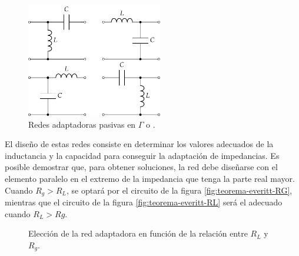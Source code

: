\begin{figure}[H]
  \centering \includegraphics[height=5cm]{../figs/Everitt_LC.pdf}
  \caption{Redes adaptadoras pasivas en $\Gamma$ o
    .}
  \label{fig:teorema-everitt-redes}
\end{figure}

El diseño de estas redes consiste en determinar los valores adecuados
de la inductancia y la capacidad para conseguir la adaptación de
impedancias. Es posible demostrar que, para obtener soluciones, la red
debe diseñarse con el elemento paralelo en el extremo de la impedancia
que tenga la parte real mayor. Cuando $R_g > R_L$, se optará por el
circuito de la figura \ref{fig:teorema-everitt-RG}, mientras que el
circuito de la figura \ref{fig:teorema-everitt-RL} será el adecuado
cuando $R_L > Rg$.

\begin{figure}[H]
  \centering {}\hspace{2cm}
  \caption{Elección de la red adaptadora en función de la relación
    entre $R_L$ y $R_g$.}
  \label{fig:teorema-everitt-RLRG}
\end{figure}


